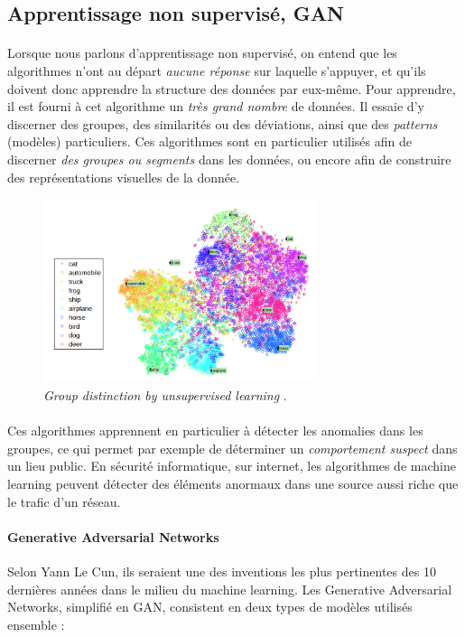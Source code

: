 \subsection*{Apprentissage non supervisé, GAN}

\paragraph{} Lorsque nous parlons d'apprentissage non supervisé, on entend que les algorithmes n'ont au départ \emph{aucune
réponse} sur laquelle s'appuyer, et qu'ils doivent donc apprendre la structure des données par eux-même. Pour apprendre, il
est fourni à cet algorithme un \emph{très grand nombre} de données. Il essaie d'y discerner des groupes, des similarités ou
des déviations, ainsi que des \emph{patterns} (modèles) particuliers. Ces algorithmes sont en particulier utilisés afin de
discerner \emph{des groupes ou segments} dans les données, ou encore afin de construire des représentations visuelles de la
donnée.

\begin{figure}[ht]
    \centering
    \includegraphics[width=300px]{chapters/03/images/clustering.png}
    \caption{\label{clustering}\emph{Group distinction by unsupervised learning} \cite{MachineLearning0}.}
\end{figure}

\paragraph{} Ces algorithmes apprennent en particulier à détecter les anomalies dans les groupes, ce qui permet par 
exemple de déterminer un \emph{comportement suspect} dans un lieu public. En sécurité informatique, sur internet, 
les algorithmes de machine learning peuvent détecter des éléments anormaux dans une source aussi riche que le trafic
d'un réseau. 

\paragraph{Generative Adversarial Networks} Selon Yann Le Cun, ils seraient une des inventions les plus pertinentes
des 10 dernières années dans le milieu du machine learning. Les Generative Adversarial Networks, simplifié en GAN,
consistent en deux types de modèles utilisés ensemble :

